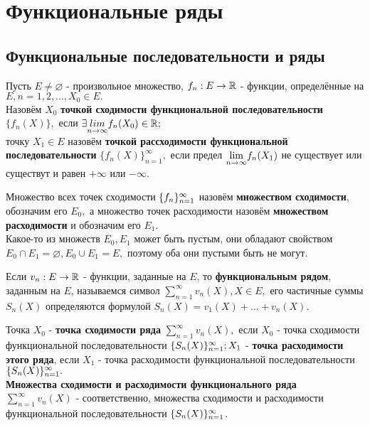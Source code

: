 \documentclass[main]{subfiles}
\begin{document}
\chapter{Функциональные ряды}
\section{Функциональные последовательности и ряды}
\begin{definition} 
    Пусть $E\neq\varnothing$ - произвольное множество, $f_n:E\to{\vR}$ - функции,
     определённые на $E, n=1,2,\ldots, X_0\in E.$\\ Назовём $X_0$
      \textbf{точкой сходимости функциональной последовательности} $\{f_n(X)\},$ если $
       \exists \underset{n\to\infty}{lim}f_n(X_0)\in{\vR};$\\
        точку $X_1\in E$ 
       назовём \textbf{точкой рассходимости функциональной последовательности} $\{f_n(X)\}_{n=1}^\infty,$ 
       если предел $\Lim f_n(X_1)$ не существует или существут и равен $+\infty$ или $-\infty$.
\end{definition}
\begin{definition}
        Множество всех точек сходимости $\fnn$ назовём \textbf{множеством сходимости}, обозначим его $E_0,$ 
        а множество точек расходимости назовём \textbf{множеством расходимости} и обозначим его $E_1$. \\
        Какое-то из множеств $E_0, E_1$ может быть пустым, они обладают свойством
         $E_0\cap E_1=\varnothing, E_0\cup E_1=E,$
         поэтому оба они пустыми быть не могут. \end{definition}
         \begin{definition}
Если $v_n:E\to {\vR}$ - функции, заданные на $E$, то \textbf{функциональным рядом}, заданным на $E$,
 называемся символ $\sum^{\infty}_{n=1} v_n(X), X\in E,$ его частичные суммы $S_n(X)$ определяются формулой
  $S_n(X)=v_1(X)+\dots+v_n(X).$ \end{definition}
  \begin{definition}
Точка $X_0$ - \textbf{точка сходимости ряда} $\sum^{\infty}_{n=1} v_n(X),$ если $X_0$ - 
точка сходимости функциональной последовательности $\fnn[S_n(X)];
 X_1$ -
 \textbf{точка расходимости этого ряда}, если $X_1$ - точка расходимости 
 функциональной последовательности $\fnn[S_n(X)].$\\ 
 \textbf{Множества сходимости и расходимости функционального ряда}
  $\sum^{\infty}_{n=1} v_n(X)$ - соответственно, множества сходимости и расходимости
   функциональной последовательности $\fnn[S_n(X)]$. 
\end{definition}
\end{document}
